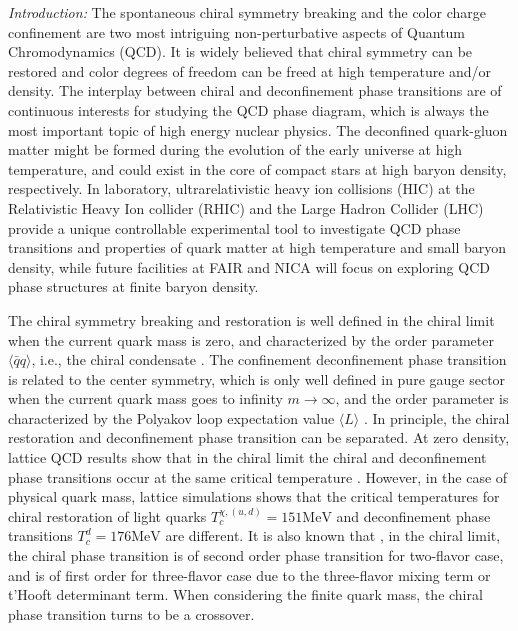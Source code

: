 \documentclass[aps,prd,showpacs,preprintnumbers,twocolumn]{revtex4}
\begin{document}
{\it Introduction:} The spontaneous chiral symmetry breaking and the color charge confinement are two most intriguing
non-perturbative aspects of
Quantum Chromodynamics (QCD). It is widely believed that chiral symmetry can be restored and color degrees of freedom can
be freed at high temperature and/or density. The interplay between chiral and deconfinement phase transitions are of continuous interests for
studying the QCD phase diagram, which is always the most important topic of high energy nuclear physics. The deconfined quark-gluon matter
might be formed during the evolution of the early universe at high temperature, and could exist in the core of compact stars at high baryon
density, respectively. In laboratory, ultrarelativistic heavy ion collisions (HIC) at the Relativistic Heavy Ion collider (RHIC) and the Large
Hadron Collider (LHC) provide a unique controllable experimental tool to investigate QCD phase transitions and properties of quark matter
at high temperature and small baryon density, while future facilities at FAIR and NICA will focus on exploring QCD phase structures at finite
baryon density.

The chiral symmetry breaking and restoration is well defined in the chiral limit when the current quark mass is zero, and characterized by the
order parameter $\langle{\bar q}q \rangle$, i.e., the chiral condensate \cite{Nambu:1961tp,Nambu:1961fr}.
The confinement deconfinement phase transition is related to the center
symmetry, which is only well defined in pure gauge sector when the current quark mass goes to infinity $m\rightarrow \infty$, and the order
parameter is characterized by the Polyakov loop expectation value $\langle L \rangle $ \cite{Polyakov:1978vu}. In principle,  the chiral restoration and deconfinement phase transition can be separated. At zero density, lattice QCD results show that in the chiral limit the chiral and deconfinement phase transitions occur at the same critical temperature \cite{Kogut:1982rt}. However, in the case of physical quark mass, lattice simulations \cite{nature-PTD} shows that the critical temperatures for chiral restoration of light quarks $T_c^{\chi,(u,d)}=151 \text{MeV}$ and deconfinement phase transitions $T_c^d=176 \text{MeV}$ are different. It is also known that
\cite{qcd-phase-diagram,deForcrand:2006pv,Kanaya:2010qd,Pisarski:1983ms}, in the chiral limit, the chiral phase transition is of second order phase transition for two-flavor case, and is of first order for three-flavor case due to the three-flavor mixing term or t'Hooft determinant term. When considering the finite quark mass, the chiral phase transition turns to be a crossover.
\end{document}
